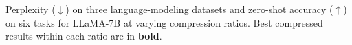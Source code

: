 
\begin{table}[t]
\centering
\footnotesize
\renewcommand{\arraystretch}{1.15}
\setlength{\tabcolsep}{3.2pt}

\caption{Perplexity ($\downarrow$) on three language-modeling datasets and zero-shot accuracy ($\uparrow$) on six tasks for LLaMA-7B at varying compression ratios. Best compressed results within each ratio are in \textbf{bold}.}
\label{tab:main-results}


\end{table}
